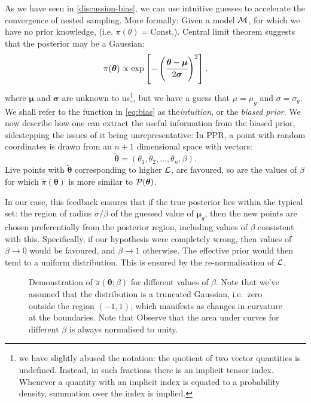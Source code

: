 \documentclass[usenatbib]{mnras}
\begin{document}
As we have seen in \cref{discussion-bias}, we can use intuitive
guesses to accelerate the convergence of nested sampling. More
formally: Given a model \({\cal M}\), for which we have no prior
knowledge, (i.e. \(\pi(\theta) = \text{Const.}\)).  Central limit
theorem suggests that the posterior may be a Gaussian:
\begin{equation}
 \pi (\bm{\theta}) \propto \exp \left[-\left(\cfrac{\bm{\theta} - \bm{\mu}}{2\bm{\sigma}}\right)^{2} \right],
 \label{eq:bias}
\end{equation}
where \(\bm{\mu}\) and \(\bm{\sigma}\) are unknown to us\footnote{we
  have slightly abused the notation: the quotient of two vector
  quantities is undefined. Instead, in such fractions there is an
  implicit tensor index. Whenever a quantity with an implicit index is
  equated to a probability density, summation over the index is
  implied.}, but we have a guess that $\mu=\mu_{g}$ and
$\sigma=\sigma_{g}$. We shall refer to the function in \cref{eq:bias}
as the\emph{intuition}, or the \emph{biased prior}. We now describe
how one can extract the useful information from the biased prior,
sidestepping the issues of it being unrepresentative: In PPR, a point
with random coordinates is drawn from an \(n+1\) dimensional space
with vectors:
\begin{equation}
  \tilde{\bm{\theta}} = (\theta_{1}, \theta_{2}, \ldots, \theta_{n}, \beta). 
\end{equation}
Live points with $\tilde{\bm{\theta}}$ corresponding to higher
${\cal L}$, are favoured, so are the values of $\beta$ for which
$\tilde{\pi}(\bm{\theta})$ is more similar to ${\cal P}(\bm{\theta})$.

In our case, this feedback ensures that if the true posterior lies
within the typical set: the region of radius \(\sigma / \beta\) of the
guessed value of \(\bm{\mu}_{g}\), then the new points are chosen
preferentially from the posterior region, including values of
\(\beta\) consistent with this. Specifically, if our hypothesis were
completely wrong, then values of \(\beta \rightarrow 0\) would be
favoured, and $\beta\rightarrow 1$ otherwise. The effective prior
would then tend to a uniform distribution. This is ensured by the
re-normalisation of \({\cal L}\).

\begin{figure}
 
 \caption{\label{org44950de} Demonstration of
   \(\tilde{\pi}(\bm{\theta}; \beta)\) for different values of
   \(\beta\). Note that we've assumed that the distribution is a
   truncated Gaussian, i.e.~zero outside the region \((-1, 1)\), which
   manifests as changes in curvature at the boundaries. Note that
   Observe that the area under curves for different $\beta$ is always
   normalised to unity. }
\end{figure}
\end{document}
